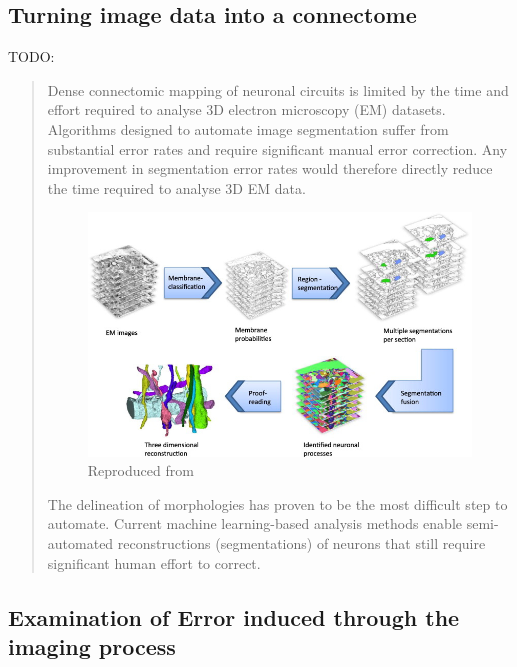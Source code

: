 \subsection{Turning image data into a connectome}
TODO:
\begin{quote}
    Dense connectomic mapping of neuronal circuits is limited by the time and
    effort required to analyse 3D electron microscopy (EM) datasets. Algorithms
    designed to automate image segmentation suffer from substantial error rates
    and require significant manual error correction. Any improvement in
    segmentation error rates would therefore directly reduce the time required
    to analyse 3D EM data.
    \autocite{pallotto_extracellular_2015} 

    \begin{figure}[h]
        \centering
        \includegraphics[scale=0.75]{figures/images/reconstruction.jpg}
        {Reproduced from \cite{kaynig_large-scale_2015}}
        \label{reconstruction}
    \end{figure}
    \vspace{1ex}

    The delineation of morphologies has proven to be the most difficult step to
    automate. Current machine learning-based analysis methods enable
    semi-automated reconstructions (segmentations) of neurons that still require
    significant human effort to correct.
    \autocite{helmstaedter_connectomic_2013}
\end{quote}

\subsection[Error induced through noise]{Examination of Error induced through the imaging process}

